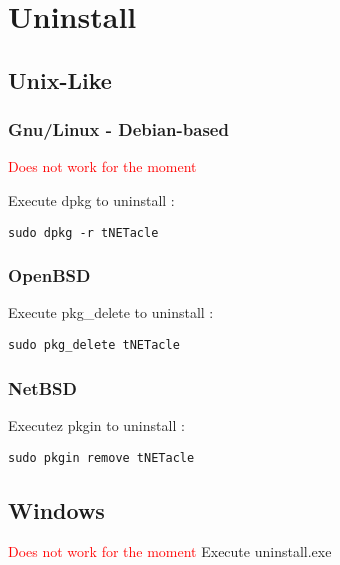 \section{Uninstall}
\subsection{Unix-Like}
\subsubsection{Gnu/Linux - Debian-based}
\textcolor{red}{Does not work for the moment}

Execute dpkg to uninstall :

\begin{lstlisting}
sudo dpkg -r tNETacle
\end{lstlisting}

\subsubsection{OpenBSD}

Execute pkg\_delete to uninstall :

\begin{lstlisting}
sudo pkg_delete tNETacle
\end{lstlisting}

\subsubsection{NetBSD}

Executez pkgin to uninstall :

\begin{lstlisting}
sudo pkgin remove tNETacle
\end{lstlisting}

\subsection{Windows}
\textcolor{red}{Does not work for the moment}
Execute uninstall.exe
